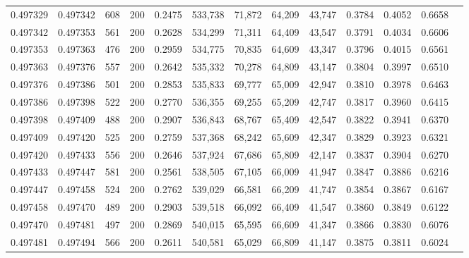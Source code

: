 \begin{tabular}{rrrrrrrrrrrrr}
0.497329 & 0.497342 &    608 & 200 &                                     0.2475 & 533,738 &  71,872 &  64,209 &  43,747 & 0.3784 & 0.4052 & 0.6658 \\
0.497342 & 0.497353 &    561 & 200 &                                     0.2628 & 534,299 &  71,311 &  64,409 &  43,547 & 0.3791 & 0.4034 & 0.6606 \\
0.497353 & 0.497363 &    476 & 200 &                                     0.2959 & 534,775 &  70,835 &  64,609 &  43,347 & 0.3796 & 0.4015 & 0.6561 \\
0.497363 & 0.497376 &    557 & 200 &                                     0.2642 & 535,332 &  70,278 &  64,809 &  43,147 & 0.3804 & 0.3997 & 0.6510 \\
0.497376 & 0.497386 &    501 & 200 &                                     0.2853 & 535,833 &  69,777 &  65,009 &  42,947 & 0.3810 & 0.3978 & 0.6463 \\
0.497386 & 0.497398 &    522 & 200 &                                     0.2770 & 536,355 &  69,255 &  65,209 &  42,747 & 0.3817 & 0.3960 & 0.6415 \\
0.497398 & 0.497409 &    488 & 200 &                                     0.2907 & 536,843 &  68,767 &  65,409 &  42,547 & 0.3822 & 0.3941 & 0.6370 \\
0.497409 & 0.497420 &    525 & 200 &                                     0.2759 & 537,368 &  68,242 &  65,609 &  42,347 & 0.3829 & 0.3923 & 0.6321 \\
0.497420 & 0.497433 &    556 & 200 &                                     0.2646 & 537,924 &  67,686 &  65,809 &  42,147 & 0.3837 & 0.3904 & 0.6270 \\
0.497433 & 0.497447 &    581 & 200 &                                     0.2561 & 538,505 &  67,105 &  66,009 &  41,947 & 0.3847 & 0.3886 & 0.6216 \\
0.497447 & 0.497458 &    524 & 200 &                                     0.2762 & 539,029 &  66,581 &  66,209 &  41,747 & 0.3854 & 0.3867 & 0.6167 \\
0.497458 & 0.497470 &    489 & 200 &                                     0.2903 & 539,518 &  66,092 &  66,409 &  41,547 & 0.3860 & 0.3849 & 0.6122 \\
0.497470 & 0.497481 &    497 & 200 &                                     0.2869 & 540,015 &  65,595 &  66,609 &  41,347 & 0.3866 & 0.3830 & 0.6076 \\
0.497481 & 0.497494 &    566 & 200 &                                     0.2611 & 540,581 &  65,029 &  66,809 &  41,147 & 0.3875 & 0.3811 & 0.6024 \\

\end{tabular}
